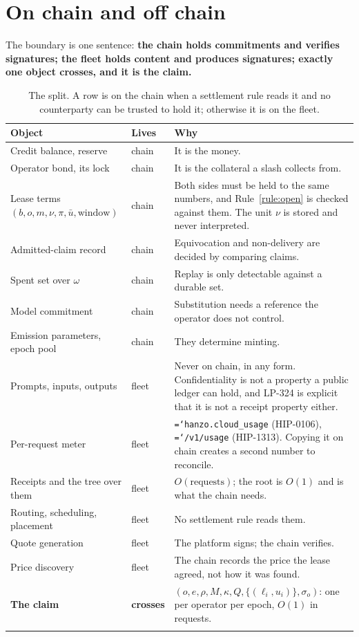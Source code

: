 \documentclass[11pt,a4paper]{article}
\newcommand{\code}[1]{\texttt{\hyphenchar\font=`\-\relax #1}}
\begin{document}
\section{On chain and off chain}
\label{sec:split}

The boundary is one sentence: \textbf{the chain holds commitments and verifies
signatures; the fleet holds content and produces signatures; exactly one object
crosses, and it is the claim.}

\begin{longtable}{@{}p{}p{}p{}@{}}
\toprule
Object & Lives & Why \\
\midrule
\endhead
Credit balance, reserve & chain & It is the money. \\
Operator bond, its lock & chain & It is the collateral a slash collects from. \\
Lease terms $(b,o,m,\nu,\pi,\bar u,\text{window})$ & chain & Both sides must be
held to the same numbers, and Rule~\ref{rule:open} is checked against them. The
unit $\nu$ is stored and never interpreted. \\
Admitted-claim record & chain & Equivocation and non-delivery are decided by
comparing claims. \\
Spent set over $\omega$ & chain & Replay is only detectable against a durable set. \\
Model commitment & chain & Substitution needs a reference the operator does not
control. \\
Emission parameters, epoch pool & chain & They determine minting. \\
\midrule
Prompts, inputs, outputs & fleet & Never on chain, in any form. Confidentiality
is not a property a public ledger can hold, and LP-324 is explicit that it is
not a receipt property either. \\
Per-request meter & fleet & \code{hanzo.cloud\_usage} (HIP-0106),
\code{/v1/usage} (HIP-1313). Copying it on chain creates a second number to
reconcile. \\
Receipts and the tree over them & fleet & $O(\text{requests})$; the root is
$O(1)$ and is what the chain needs. \\
Routing, scheduling, placement & fleet & No settlement rule reads them. \\
Quote generation & fleet & The platform signs; the chain verifies. \\
Price discovery & fleet & The chain records the price the lease agreed, not how
it was found. \\
\midrule
\textbf{The claim} & \textbf{crosses} & $(o,e,\rho,M,\kappa,Q,\{(\ell_i,u_i)\},\sigma_o)$:
one per operator per epoch, $O(1)$ in requests. \\
\bottomrule
\caption{The split. A row is on the chain when a settlement rule reads it and no
counterparty can be trusted to hold it; otherwise it is on the fleet.}
\end{longtable}
\end{document}
